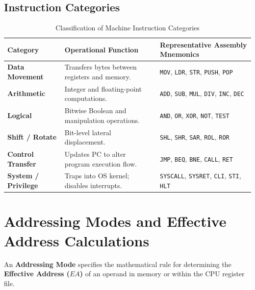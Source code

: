 \subsection{Instruction Categories}
\begin{table}[htbp]
\centering
\small
\caption{Classification of Machine Instruction Categories}
\label{tab:instruction_types}
\begin{tabularx}{\textwidth}{l X X}
\toprule
\textbf{Category} & \textbf{Operational Function} & \textbf{Representative Assembly Mnemonics} \\
\midrule
\textbf{Data Movement} & Transfers bytes between registers and memory. & \texttt{MOV}, \texttt{LDR}, \texttt{STR}, \texttt{PUSH}, \texttt{POP} \\
\textbf{Arithmetic} & Integer and floating-point computations. & \texttt{ADD}, \texttt{SUB}, \texttt{MUL}, \texttt{DIV}, \texttt{INC}, \texttt{DEC} \\
\textbf{Logical} & Bitwise Boolean and manipulation operations. & \texttt{AND}, \texttt{OR}, \texttt{XOR}, \texttt{NOT}, \texttt{TEST} \\
\textbf{Shift / Rotate} & Bit-level lateral displacement. & \texttt{SHL}, \texttt{SHR}, \texttt{SAR}, \texttt{ROL}, \texttt{ROR} \\
\textbf{Control Transfer} & Updates PC to alter program execution flow. & \texttt{JMP}, \texttt{BEQ}, \texttt{BNE}, \texttt{CALL}, \texttt{RET} \\
\textbf{System / Privilege} & Traps into OS kernel; disables interrupts. & \texttt{SYSCALL}, \texttt{SYSRET}, \texttt{CLI}, \texttt{STI}, \texttt{HLT} \\
\bottomrule
\end{tabularx}
\end{table}


\section{Addressing Modes and Effective Address Calculations}
\label{sec:addressing_modes}

An \textbf{Addressing Mode} specifies the mathematical rule for determining the \textbf{Effective Address ($EA$)} of an operand in memory or within the CPU register file.

